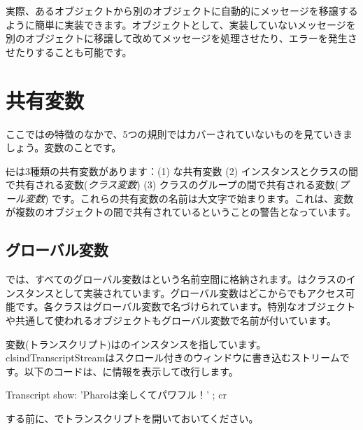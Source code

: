 \documentclass[a4paper,10pt,twoside]{book}
\begin{document}
実際、あるオブジェクトから別のオブジェクトに自動的にメッセージを移譲するように簡単に実装できます。オブジェクトとして、実装していないメッセージを別のオブジェクトに移譲して改めてメッセージを処理させたり、エラーを発生させたりすることも可能です。

\section{共有変数}

ここでは\st の特徴のなかで、5つの規則ではカバーされていないものを見ていきましょう。変数のことです。

\st には3種類の共有変数があります：(1) な共有変数 (2) インスタンスとクラスの間で共有される変数(\emph{クラス変数}) (3) クラスのグループの間で共有される変数(\emph{プール変数}) です。これらの共有変数の名前は大文字で始まります。これは、変数が複数のオブジェクトの間で共有されているということの警告となっています。

\subsection{グローバル変数}
\pharo では、すべてのグローバル変数はという名前空間に格納されます。はクラスのインスタンスとして実装されています。グローバル変数はどこからでもアクセス可能です。各クラスはグローバル変数で名づけられています。特別なオブジェクトや共通して使われるオブジェクトもグローバル変数で名前が付いています。

変数(トランスクリプト)はのインスタンスを指しています。clsind{TranscriptStream}はスクロール付きのウィンドウに書き込むストリームです。以下のコードは、に情報を表示して改行します。

\begin{code}{}
Transcript show: 'Pharoは楽しくてパワフル！' ; cr
\end{code}

\noindent
{}する前に、でトランスクリプトを開いておいてください。

\end{document}

